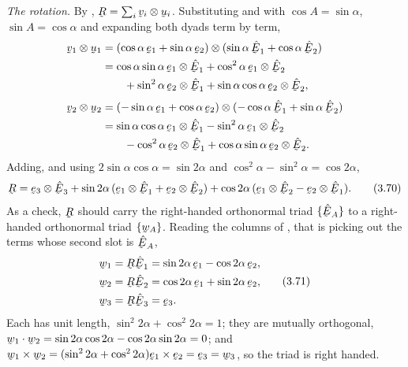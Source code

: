 \smallskip
\noindent\emph{The rotation.} By , $\bR=\sum_{i}\bv_{i}\otimes
\bu_{i}$. Substituting  and  with $\cos A=\sin\alpha$,
$\sin A=\cos\alpha$ and expanding both dyads term by term,
\[
\begin{aligned}
   \bv_{1}\otimes\bu_{1}
   &=(\cos\alpha\,\be_{1}+\sin\alpha\,\be_{2})
     \otimes(\sin\alpha\,\hbE_{1}+\cos\alpha\,\hbE_{2})\\
   &=\cos\alpha\sin\alpha\,\be_{1}\otimes\hbE_{1}
    +\cos^{2}\alpha\,\be_{1}\otimes\hbE_{2}\\
   &\qquad+\sin^{2}\alpha\,\be_{2}\otimes\hbE_{1}
    +\sin\alpha\cos\alpha\,\be_{2}\otimes\hbE_{2},\\[1mm]
   \bv_{2}\otimes\bu_{2}
   &=(-\sin\alpha\,\be_{1}+\cos\alpha\,\be_{2})
     \otimes(-\cos\alpha\,\hbE_{1}+\sin\alpha\,\hbE_{2})\\
   &=\sin\alpha\cos\alpha\,\be_{1}\otimes\hbE_{1}
    -\sin^{2}\alpha\,\be_{1}\otimes\hbE_{2}\\
   &\qquad-\cos^{2}\alpha\,\be_{2}\otimes\hbE_{1}
    +\cos\alpha\sin\alpha\,\be_{2}\otimes\hbE_{2}.
\end{aligned}
\]
Adding, and using $2\sin\alpha\cos\alpha=\sin2\alpha$ and
$\cos^{2}\alpha-\sin^{2}\alpha=\cos2\alpha$,
\begin{equation}
   \bR=\be_{3}\otimes\hbE_{3}
      +\sin2\alpha\,(\be_{1}\otimes\hbE_{1}+\be_{2}\otimes\hbE_{2})
      +\cos2\alpha\,(\be_{1}\otimes\hbE_{2}-\be_{2}\otimes\hbE_{1}).
   \tag{3.70}\label{eq:3.70}
\end{equation}
As a check, $\bR$ should carry the right-handed orthonormal triad
$\{\hbE_{A}\}$ to a right-handed orthonormal triad $\{\bw_{A}\}$. Reading
the columns of , that is picking out the terms whose second slot
is $\hbE_{A}$,
\begin{equation}
\begin{aligned}
   \bw_{1}&=\bR\hbE_{1}=\sin2\alpha\,\be_{1}-\cos2\alpha\,\be_{2},\\
   \bw_{2}&=\bR\hbE_{2}=\cos2\alpha\,\be_{1}+\sin2\alpha\,\be_{2},\\
   \bw_{3}&=\bR\hbE_{3}=\be_{3}.
\end{aligned}
   \tag{3.71}\label{eq:3.71}
\end{equation}
Each has unit length, $\sin^{2}2\alpha+\cos^{2}2\alpha=1$; they are
mutually orthogonal, $\ip{\bw_{1}}{\bw_{2}}=\sin2\alpha\cos2\alpha
-\cos2\alpha\sin2\alpha=0$; and
$\bw_{1}\times\bw_{2}=(\sin^{2}2\alpha+\cos^{2}2\alpha)\be_{1}\times
\be_{2}=\be_{3}=\bw_{3}$, so the triad is right handed.

